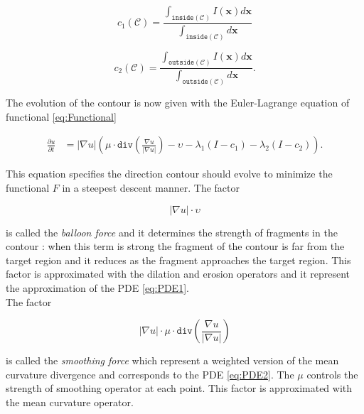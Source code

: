 \begin{equation}
	c_1(\mathcal{C}) = \frac{\int_{\mathtt{inside}(\mathcal{C})}I(\mathbf{x})d\mathbf{x}}{\int_{\mathtt{inside}(\mathcal{C})}d\mathbf{x}}
\end{equation}

\begin{equation}
	c_2(\mathcal{C}) = \frac{\int_{\mathtt{outside}(\mathcal{C})}I(\mathbf{x})d\mathbf{x}}{\int_{\mathtt{outside}(\mathcal{C})}d\mathbf{x}}.
\end{equation}

The evolution of the contour is now given with the Euler-Lagrange equation of functional \ref{eq:Functional}

\begin{equation}
	\begin{split}
		\frac{\partial u}{\partial t} & = | \nabla u | \left ( \mu \cdot \mathtt{div} \left ( \frac{\nabla u}{|\nabla u|}  \right ) - \upsilon - \lambda_1(I - c_1) -\lambda_2 (I - c_2) \right ) .
	\end{split}
\end{equation}

This equation specifies the direction contour should evolve to minimize the functional $F$ in a steepest descent manner. The factor 

\begin{equation}
	|\nabla u| \cdot \upsilon
\end{equation} 

is called the \textit{balloon force} and it determines the strength of fragments in the contour : when this term is strong the fragment of the contour is far from the target region and it reduces as the fragment approaches the target region. This factor is approximated with the dilation and erosion operators and it represent the approximation of the PDE \ref{eq:PDE1}. \\

The factor

\begin{equation}
	| \nabla u | \cdot \mu \cdot \mathtt{div} \left ( \frac{\nabla u}{|\nabla u|}  \right )
\end{equation}

is called the \textit{smoothing force} which represent a weighted version of the mean curvature divergence and corresponds to the PDE \ref{eq:PDE2}. The $\mu$ controls the strength of smoothing operator at each point. This factor is approximated with the mean curvature operator. \\

